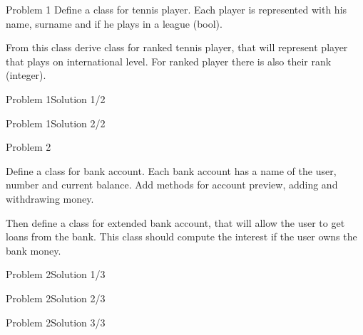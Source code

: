 
\begin{frame}{Problem 1}
Define a class for tennis player. Each player is represented with his name,
surname and if he plays in a league (bool).

From this class derive class for ranked tennis player, that will represent
player that plays on international level. For ranked player there is also their
rank (integer).
\end{frame}

\begin{frame}[fragile]{Problem 1}{Solution 1/2}

\end{frame}

\begin{frame}[fragile]{Problem 1}{Solution 2/2}

\end{frame}

\begin{frame}{Problem 2}

Define a class for bank account. Each bank account has a name of the user,
number and current balance. Add methods for account preview, adding and
withdrawing money.

Then define a class for extended bank account, that will allow the user to get
loans from the bank. This class should compute the interest if the user owns the
bank money.

\end{frame}

\begin{frame}[fragile]{Problem 2}{Solution 1/3}

\end{frame}

\begin{frame}[fragile]{Problem 2}{Solution 2/3}

\end{frame}

\begin{frame}[fragile]{Problem 2}{Solution 3/3}

\end{frame}
